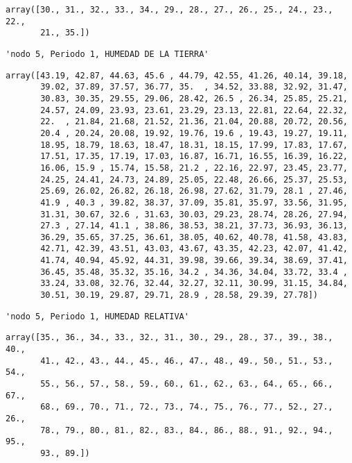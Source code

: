 \documentclass[11pt]{article}
\begin{document}
    
    
    \begin{verbatim}
array([30., 31., 32., 33., 34., 29., 28., 27., 26., 25., 24., 23., 22.,
       21., 35.])
    \end{verbatim}

    
    
    \begin{verbatim}
'nodo 5, Periodo 1, HUMEDAD DE LA TIERRA'
    \end{verbatim}

    
    
    \begin{verbatim}
array([43.19, 42.87, 44.63, 45.6 , 44.79, 42.55, 41.26, 40.14, 39.18,
       39.02, 37.89, 37.57, 36.77, 35.  , 34.52, 33.88, 32.92, 31.47,
       30.83, 30.35, 29.55, 29.06, 28.42, 26.5 , 26.34, 25.85, 25.21,
       24.57, 24.09, 23.93, 23.61, 23.29, 23.13, 22.81, 22.64, 22.32,
       22.  , 21.84, 21.68, 21.52, 21.36, 21.04, 20.88, 20.72, 20.56,
       20.4 , 20.24, 20.08, 19.92, 19.76, 19.6 , 19.43, 19.27, 19.11,
       18.95, 18.79, 18.63, 18.47, 18.31, 18.15, 17.99, 17.83, 17.67,
       17.51, 17.35, 17.19, 17.03, 16.87, 16.71, 16.55, 16.39, 16.22,
       16.06, 15.9 , 15.74, 15.58, 21.2 , 22.16, 22.97, 23.45, 23.77,
       24.25, 24.41, 24.73, 24.89, 25.05, 22.48, 26.66, 25.37, 25.53,
       25.69, 26.02, 26.82, 26.18, 26.98, 27.62, 31.79, 28.1 , 27.46,
       41.9 , 40.3 , 39.82, 38.37, 37.09, 35.81, 35.97, 33.56, 31.95,
       31.31, 30.67, 32.6 , 31.63, 30.03, 29.23, 28.74, 28.26, 27.94,
       27.3 , 27.14, 41.1 , 38.86, 38.53, 38.21, 37.73, 36.93, 36.13,
       36.29, 35.65, 37.25, 36.61, 38.05, 40.62, 40.78, 41.58, 43.83,
       42.71, 42.39, 43.51, 43.03, 43.67, 43.35, 42.23, 42.07, 41.42,
       41.74, 40.94, 45.92, 44.31, 39.98, 39.66, 39.34, 38.69, 37.41,
       36.45, 35.48, 35.32, 35.16, 34.2 , 34.36, 34.04, 33.72, 33.4 ,
       33.24, 33.08, 32.76, 32.44, 32.27, 32.11, 30.99, 31.15, 34.84,
       30.51, 30.19, 29.87, 29.71, 28.9 , 28.58, 29.39, 27.78])
    \end{verbatim}

    
    
    \begin{verbatim}
'nodo 5, Periodo 1, HUMEDAD RELATIVA'
    \end{verbatim}

    
    
    \begin{verbatim}
array([35., 36., 34., 33., 32., 31., 30., 29., 28., 37., 39., 38., 40.,
       41., 42., 43., 44., 45., 46., 47., 48., 49., 50., 51., 53., 54.,
       55., 56., 57., 58., 59., 60., 61., 62., 63., 64., 65., 66., 67.,
       68., 69., 70., 71., 72., 73., 74., 75., 76., 77., 52., 27., 26.,
       78., 79., 80., 81., 82., 83., 84., 86., 88., 91., 92., 94., 95.,
       93., 89.])
    \end{verbatim}
\end{document}
